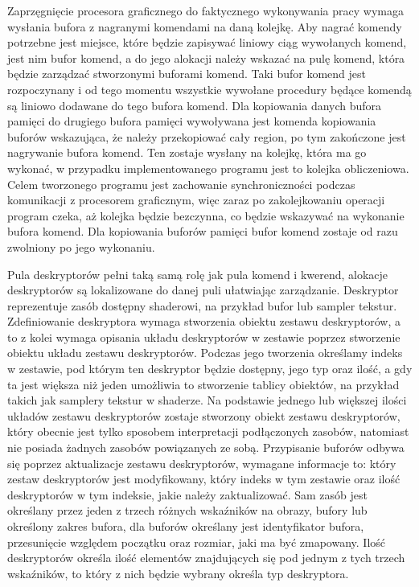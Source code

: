 Zaprzęgnięcie procesora graficznego do faktycznego wykonywania pracy wymaga wysłania bufora z nagranymi komendami na daną kolejkę.
Aby nagrać komendy potrzebne jest miejsce, które będzie zapisywać liniowy ciąg wywołanych komend, jest nim bufor komend, a do jego alokacji należy wskazać na pulę komend, która będzie zarządzać stworzonymi buforami komend.
Taki bufor komend jest rozpoczynany i od tego momentu wszystkie wywołane procedury będące komendą są liniowo dodawane do tego bufora komend.
Dla kopiowania danych bufora pamięci do drugiego bufora pamięci wywoływana jest komenda kopiowania buforów wskazująca, że należy przekopiować cały region, po tym zakończone jest nagrywanie bufora komend.
Ten zostaje wysłany na kolejkę, która ma go wykonać, w przypadku implementowanego programu jest to kolejka obliczeniowa.
Celem tworzonego programu jest zachowanie synchroniczności podczas komunikacji z procesorem graficznym, więc zaraz po zakolejkowaniu operacji program czeka, aż kolejka będzie bezczynna, co będzie wskazywać na wykonanie bufora komend.
Dla kopiowania buforów pamięci bufor komend zostaje od razu zwolniony po jego wykonaniu.

Pula deskryptorów pełni taką samą rolę jak pula komend i kwerend, alokacje deskryptorów są lokalizowane do danej puli ułatwiając zarządzanie.
Deskryptor reprezentuje zasób dostępny shaderowi, na przykład bufor lub sampler tekstur.
Zdefiniowanie deskryptora wymaga stworzenia obiektu zestawu deskryptorów, a to z kolei wymaga opisania układu deskryptorów w zestawie poprzez stworzenie obiektu układu zestawu deskryptorów.
Podczas jego tworzenia określamy indeks w zestawie, pod którym ten deskryptor będzie dostępny, jego typ oraz ilość, a gdy ta jest większa niż jeden umożliwia to stworzenie tablicy obiektów, na przykład takich jak samplery tekstur w shaderze.
Na podstawie jednego lub większej ilości układów zestawu deskryptorów zostaje stworzony obiekt zestawu deskryptorów, który obecnie jest tylko sposobem interpretacji podłączonych zasobów, natomiast nie posiada żadnych zasobów powiązanych ze sobą.
Przypisanie buforów odbywa się poprzez aktualizacje zestawu deskryptorów, wymagane informacje to: który zestaw deskryptorów jest modyfikowany, który indeks w tym zestawie oraz ilość deskryptorów w tym indeksie, jakie należy zaktualizować.
Sam zasób jest określany przez jeden z trzech różnych wskaźników na obrazy, bufory lub określony zakres bufora, dla buforów określany jest identyfikator bufora, przesunięcie względem początku oraz rozmiar, jaki ma być zmapowany.
Ilość deskryptorów określa ilość elementów znajdujących się pod jednym z tych trzech wskaźników, to który z nich będzie wybrany określa typ deskryptora.

